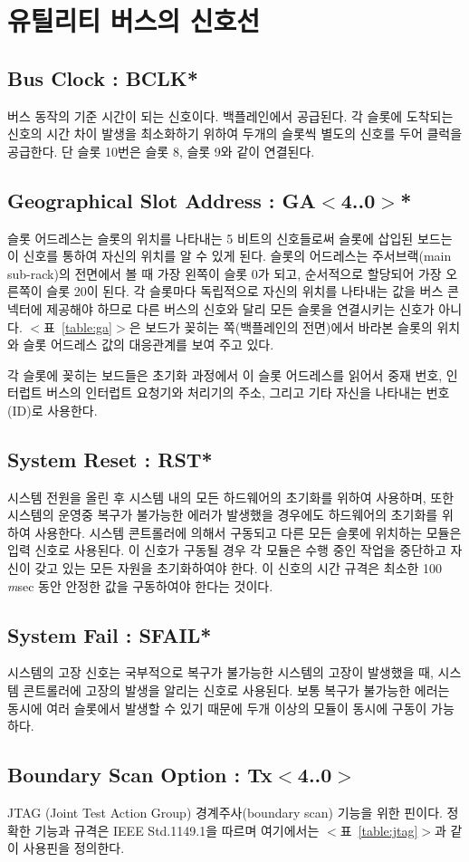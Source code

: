 \section{유틸리티 버스의 신호선}
%

%
\subsection*{Bus Clock : BCLK*}
버스 동작의 기준 시간이 되는 신호이다. 백플레인에서 공급된다.
각 슬롯에 도착되는 신호의 시간 차이 발생을 최소화하기 위하여
두개의 슬롯씩 별도의 신호를 두어 클럭을 공급한다. 단 슬롯 10번은
슬롯 8, 슬롯  9와 같이 연결된다.
%
\subsection*{Geographical Slot Address : GA$<$4..0$>$*}
슬롯 어드레스는 슬롯의 위치를 나타내는 5 비트의 신호들로써 슬롯에 삽입된 보드는
이 신호를 통하여 자신의 위치를 알 수 있게 된다.
슬롯의 어드레스는 주서브랙(main sub-rack)의 전면에서 볼 때 가장 왼쪽이 슬롯 0가 되고, 
순서적으로 할당되어 가장 오른쪽이 슬롯 20이 된다.
각 슬롯마다 독립적으로 자신의 위치를 나타내는 값을 버스 콘넥터에 제공해야 하므로
다른 버스의 신호와 달리 모든 슬롯을 연결시키는 신호가 아니다.
$<$표~\ref{table:ga}$>$은 보드가 꽂히는 쪽(백플레인의 전면)에서 바라본 슬롯의 위치와
슬롯 어드레스 값의 대응관계를 보여 주고 있다.
%

%
각 슬롯에 꽂히는 보드들은 초기화 과정에서 이 슬롯 어드레스를 읽어서 중재 번호, 인터럽트 버스의
인터럽트 요청기와 처리기의 주소, 그리고 기타 자신을 나타내는 번호(ID)로 사용한다.
%
\subsection*{System Reset : RST*}
시스템 전원을 올린 후 시스템 내의 모든 하드웨어의 초기화를 위하여 사용하며, 또한 시스템의 운영중
복구가 불가능한 에러가 발생했을 경우에도 하드웨어의 초기화를 위하여 사용한다.
시스템 콘트롤러에 의해서 구동되고 다른 모든 슬롯에 위치하는 모듈은 입력 신호로 사용된다.
이 신호가 구동될 경우 각 모듈은 수행 중인 작업을 중단하고 자신이 갖고 있는 모든 자원을 
초기화하여야 한다. 이 신호의 시간 규격은 최소한 100 {\it m\/}sec
동안 안정한 값을 구동하여야 한다는 것이다.
%
\subsection*{System Fail : SFAIL*}
시스템의 고장 신호는 국부적으로 복구가 불가능한 시스템의 고장이 발생했을 때, 시스템 콘트롤러에 고장의 발생을
알리는 신호로 사용된다. 보통 복구가 불가능한 에러는 동시에 여러 슬롯에서 발생할 수 있기 때문에
두개 이상의 모듈이 동시에 구동이 가능하다.
%
\subsection*{Boundary Scan Option : Tx$<$4..0$>$}
JTAG (Joint Test Action Group) 경계주사(boundary scan) 기능을
위한 핀이다. 정확한 기능과 규격은 IEEE Std.1149.1을 따르며 여기에서는
$<$표~\ref{table:jtag}$>$과 같이 사용핀을 정의한다.

%
%
